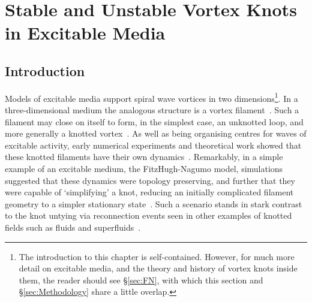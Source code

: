 \chapter{Stable and Unstable Vortex Knots in Excitable Media}
\label{ch:FitzHughNagumo}
\section{\label{sec:Introduction}Introduction}
Models of excitable media support spiral wave vortices in two dimensions\footnote{The introduction to this chapter is self-contained. However, for much more detail on excitable media, and the theory and history of vortex knots inside them, the reader should see \S\ref{sec:FN}, with which this section and \S\ref{sec:Methodology} share a little overlap.}. In a three-dimensional medium the analogous structure is a vortex filament~\citep{Winfree1983}. Such a filament may close on itself to form, in the simplest case, an unknotted loop, and more generally a knotted vortex~\citep{Winfree1983b}. As well as being organising centres for waves of excitable activity, early numerical experiments and theoretical work showed that these knotted filaments have their own dynamics~\citep{Keener1988,Winfree1990, Keener1992,Henze1993, Biktashev1994,WinfreeChapter,Dierckx2010}. Remarkably, in a simple example of an excitable medium, the FitzHugh-Nagumo model, simulations suggested that these dynamics were topology preserving, and further that they were capable of `simplifying' a knot, reducing an initially complicated filament geometry to a simpler stationary state~\citep{Winfree1990,Henze1993,WinfreeChapter}. Such a scenario stands in stark contrast to the knot untying via reconnection events seen in other examples of knotted fields such as fluids and superfluids~\citep{Kleckner2013,Scheeler2014,Kleckner2016}. 

